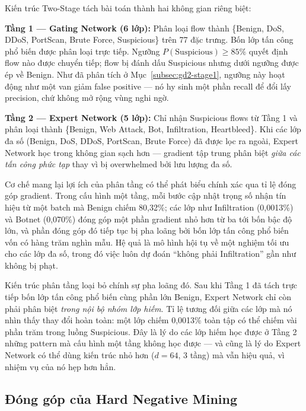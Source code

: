 \documentclass[../DoAn.tex]{subfiles}
\begin{document}
Kiến trúc Two-Stage tách bài toán thành hai không gian riêng biệt:

\textbf{Tầng 1 --- Gating Network (6 lớp):} Phân loại flow thành \{Benign, DoS, DDoS, PortScan, Brute Force, Suspicious\} trên 77 đặc trưng. Bốn lớp tấn công phổ biến được phân loại trực tiếp. Ngưỡng $P(\text{Suspicious}) \geq 85\%$ quyết định flow nào được chuyển tiếp; flow bị đánh dấu Suspicious nhưng dưới ngưỡng được ép về Benign. Như đã phân tích ở Mục~\ref{subsec:gd2-stage1}, ngưỡng này hoạt động như một van giảm false positive --- nó hy sinh một phần recall để đổi lấy precision, chứ không mở rộng vùng nghi ngờ.

\textbf{Tầng 2 --- Expert Network (5 lớp):} Chỉ nhận Suspicious flows từ Tầng 1 và phân loại thành \{Benign, Web Attack, Bot, Infiltration, Heartbleed\}. Khi các lớp đa số (Benign, DoS, DDoS, PortScan, Brute Force) đã được lọc ra ngoài, Expert Network học trong không gian sạch hơn --- gradient tập trung phân biệt \textit{giữa các tấn công phức tạp} thay vì bị overwhelmed bởi lưu lượng đa số.

Cơ chế mang lại lợi ích của phân tầng có thể phát biểu chính xác qua tỉ lệ đóng góp gradient. Trong cấu hình một tầng, mỗi bước cập nhật trọng số nhận tín hiệu từ một batch mà Benign chiếm 80,32\%; các lớp như Infiltration (0,0013\%) và Botnet (0,070\%) đóng góp một phần gradient nhỏ hơn từ ba tới bốn bậc độ lớn, và phần đóng góp đó tiếp tục bị pha loãng bởi bốn lớp tấn công phổ biến vốn có hàng trăm nghìn mẫu. Hệ quả là mô hình hội tụ về một nghiệm tối ưu cho các lớp đa số, trong đó việc luôn dự đoán ``không phải Infiltration'' gần như không bị phạt.

Kiến trúc phân tầng loại bỏ chính sự pha loãng đó. Sau khi Tầng 1 đã tách trực tiếp bốn lớp tấn công phổ biến cùng phần lớn Benign, Expert Network chỉ còn phải phân biệt \textit{trong nội bộ nhóm lớp hiếm}. Tỉ lệ tương đối giữa các lớp mà nó nhìn thấy thay đổi hoàn toàn: một lớp chiếm 0,0013\% toàn tập có thể chiếm vài phần trăm trong luồng Suspicious. Đây là lý do các lớp hiếm học được ở Tầng 2 những pattern mà cấu hình một tầng không học được --- và cũng là lý do Expert Network có thể dùng kiến trúc nhỏ hơn ($d=64$, 3 tầng) mà vẫn hiệu quả, vì nhiệm vụ của nó hẹp hơn hẳn.

\subsection{Đóng góp của Hard Negative Mining}
\label{subsec:tn-cic-hnm}
\end{document}
